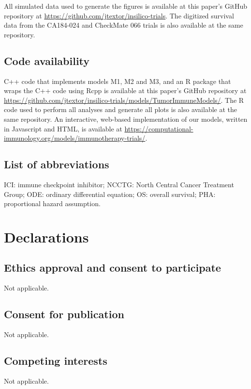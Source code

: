 \documentclass[a4paper,10pt]{article}
\begin{document}
All simulated data used to generate the figures is available at this paper's GitHub repository at 
\url{https://github.com/jtextor/insilico-trials}. The digitized survival data from the
 CA184-024 and CheckMate 066 trials is also available at the same repository. 

\subsection*{Code availability}

C++ code that implements models M1, M2 and M3, and an R package that wraps the C++ code using Rcpp
is available at this paper's GitHub repository at 
\url{https://github.com/jtextor/insilico-trials/models/TumorImmuneModels/}. 
The R code used to perform all analyses and generate all plots is also available at the same
repository. An interactive, web-based implementation of our models, written in Javascript and HTML, is 
available at \url{https://computational-immunology.org/models/immunotherapy-trials/}.

\clearpage 




\clearpage

\subsection*{List of abbreviations}
ICI: immune checkpoint inhibitor; NCCTG: North Central Cancer Treatment Group; ODE: ordinary
differential equation; OS: overall survival; PHA: proportional hazard assumption.

\clearpage

\section*{Declarations}

\subsection*{Ethics approval and consent to participate}
Not applicable.

\subsection*{Consent for publication}
Not applicable.

\subsection*{Competing interests}
Not applicable.
\end{document}
